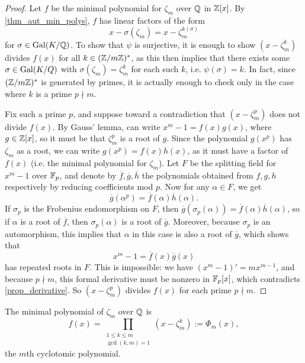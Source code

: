 \begin{proof}
    Let $f$ be the minimal polynomial for $\zeta_m$ over $\mathbb{{Q}}$ in $\mathbb{{Z}}[x]$. By \cref{thm_aut_min_polys}, $f$ has linear factors of the form
    \[
        x - \sigma(\zeta_m) = x - \zeta_m^{k(\sigma)}
    \]
    for $\sigma \in \operatorname{Gal}(K/\mathbb{Q})$. To show that $\psi$ is surjective, it is enough to show $(x - \zeta_m^k)$ divides $f(x)$ for all $k \in (\mathbb{{Z}}/{{m}}\mathbb{{Z}})^*$, as this then implies that there exists some $\sigma \in \operatorname{Gal}(K/Q)$ with $\sigma(\zeta_m) = \zeta_m^k$ for each such $k$, i.e. $\psi(\sigma) = k$. In fact, since $(\mathbb{{Z}}/{{m}}\mathbb{{Z}})^*$ is generated by primes, it is actually enough to check only in the case where $k$ is a prime $p \nmid m$.
    
    Fix such a prime $p$, and suppose toward a contradiction that $(x - \zeta_m^p)$ does not divide $f(x)$. By Gauss' lemma, can write $x^m - 1 = f(x)g(x)$, where $g \in \mathbb{{Z}}[x]$, so it must be that $\zeta_m^p$ is a root of $g$. Since the polynomial $g(x^p)$ has $\zeta_m$ as a root, we can write $g(x^p) = f(x)h(x)$, as it must have a factor of $f(x)$ (i.e. the minimal polynomial for $\zeta_m$). Let $F$ be the splitting field for $x^m - 1$ over $\mathbb{{F}}_p$, and denote by $\overline{f}, \overline{g}, \overline{h}$ the polynomials obtained from $f, g, h$ respectively by reducing coefficients mod $p$. Now for any $\alpha \in F$, we get
    \[
        \overline{g}(\alpha^p) = \overline{f}(\alpha)\overline{h}(\alpha).
    \]
    If $\sigma_p$ is the Frobenius endomorphism on $F$, then $\overline{g}(\sigma_p(\alpha)) = \overline{f}(\alpha) \overline{h}(\alpha)$, so if $\alpha$ is a root of $\overline{f}$, then $\sigma_p(\alpha)$ is a root of $\overline{g}$. Moreover, because $\sigma_p$ is an automorphism, this implies that $\alpha$ in this case is also a root of $\overline{g}$, which shows that
    \[
        x^m - 1 = \overline{f}(x) \overline{g}(x)
    \]
    has repeated roots in $F$. This is impossible: we have $(x^m - 1)' = mx^{m - 1}$, and because $p \nmid m$, this formal derivative must be nonzero in $\mathbb{{F}}_p[x]$, which contradicts \cref{prop_derivative}. So $(x - \zeta_m^p)$ divides $f(x)$ for each prime $p \nmid m$.
\end{proof}

\begin{corollary}
    The minimal polynomial of $\zeta_m$ over $\mathbb{{Q}}$ is
    \[
        f(x) = \prod_{\substack{1 \leq k \leq m \\ \gcd(k, m) = 1}} (x - \zeta_m^k) := \Phi_m(x),
    \]
    the $m$th cyclotomic polynomial.
\end{corollary}

